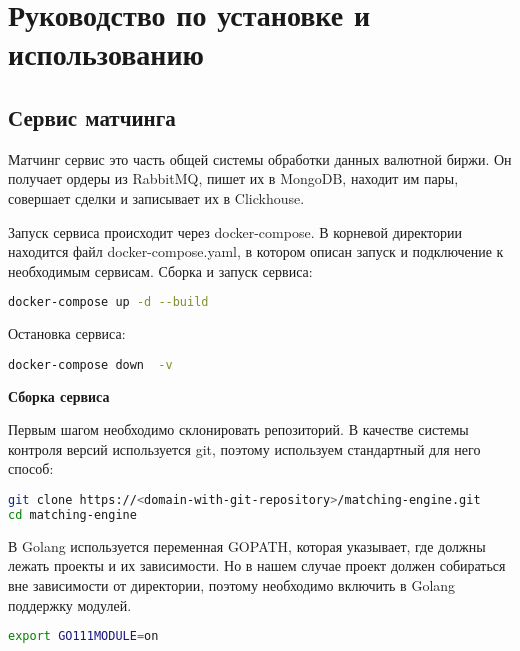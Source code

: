 \section{Руководство по установке и использованию}\label{sec:manual}

\subsection{Сервис матчинга}

Матчинг сервис это часть общей системы обработки данных валютной биржи. Он получает ордеры из RabbitMQ, пишет их в MongoDB, находит им пары, совершает сделки и записывает их в Clickhouse.

Запуск сервиса происходит через docker-compose. В корневой директории находится файл docker-compose.yaml, в котором описан запуск и подключение к необходимым сервисам. Сборка и запуск сервиса:

\begin{lstlisting}[language=bash]
docker-compose up -d --build
\end{lstlisting}

Остановка сервиса:

\begin{lstlisting}[language=bash]
docker-compose down  -v
\end{lstlisting}

\textbf{Сборка сервиса}

Первым шагом необходимо склонировать репозиторий. В качестве системы контроля версий используется git, поэтому используем стандартный для него способ:

\begin{lstlisting}[language=bash]
git clone https://<domain-with-git-repository>/matching-engine.git
cd matching-engine
\end{lstlisting}

В Golang используется переменная GOPATH, которая указывает, где должны лежать проекты и их зависимости. Но в нашем случае проект должен собираться вне зависимости от директории, поэтому необходимо включить в Golang поддержку модулей.

\begin{lstlisting}[language=bash]
export GO111MODULE=on
\end{lstlisting}

